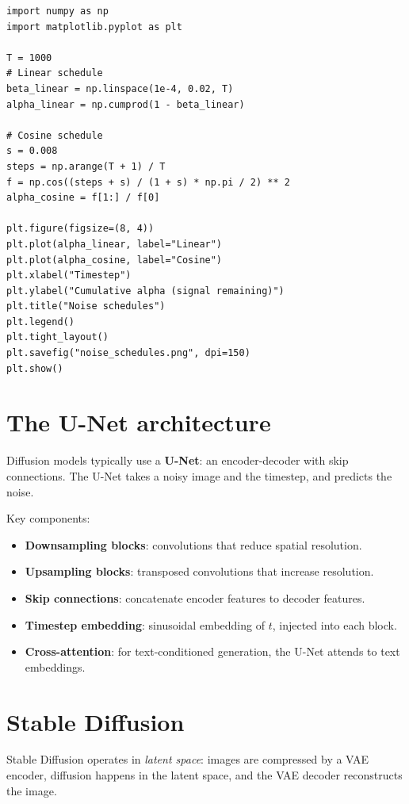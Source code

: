 \begin{verbatim}
import numpy as np
import matplotlib.pyplot as plt

T = 1000
# Linear schedule
beta_linear = np.linspace(1e-4, 0.02, T)
alpha_linear = np.cumprod(1 - beta_linear)

# Cosine schedule
s = 0.008
steps = np.arange(T + 1) / T
f = np.cos((steps + s) / (1 + s) * np.pi / 2) ** 2
alpha_cosine = f[1:] / f[0]

plt.figure(figsize=(8, 4))
plt.plot(alpha_linear, label="Linear")
plt.plot(alpha_cosine, label="Cosine")
plt.xlabel("Timestep")
plt.ylabel("Cumulative alpha (signal remaining)")
plt.title("Noise schedules")
plt.legend()
plt.tight_layout()
plt.savefig("noise_schedules.png", dpi=150)
plt.show()
\end{verbatim}

\section{The U-Net architecture}

Diffusion models typically use a \textbf{U-Net}: an encoder-decoder with skip connections. The U-Net takes a noisy image and the timestep, and predicts the noise.

Key components:
\begin{itemize}
  \item \textbf{Downsampling blocks}: convolutions that reduce spatial resolution.
  \item \textbf{Upsampling blocks}: transposed convolutions that increase resolution.
  \item \textbf{Skip connections}: concatenate encoder features to decoder features.
  \item \textbf{Timestep embedding}: sinusoidal embedding of $t$, injected into each block.
  \item \textbf{Cross-attention}: for text-conditioned generation, the U-Net attends to text embeddings.
\end{itemize}

\section{Stable Diffusion}

Stable Diffusion operates in \emph{latent space}: images are compressed by a VAE encoder, diffusion happens in the latent space, and the VAE decoder reconstructs the image.

